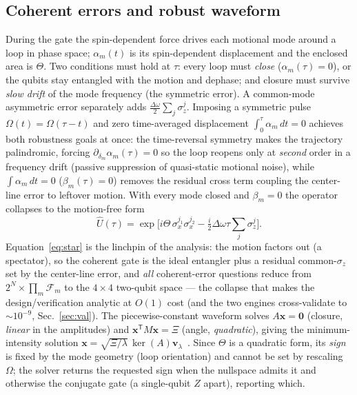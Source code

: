 \documentclass[aps,prapplied,twocolumn,superscriptaddress,floatfix,nofootinbib]{revtex4-2}
\begin{document}
\subsection{Coherent errors and robust waveform}
During the gate the spin-dependent force drives each motional mode around a loop in phase
space; $\alpha_m(t)$ is its spin-dependent displacement and the enclosed area is $\Theta$. Two
conditions must hold at $\tau$: every loop must \emph{close} ($\alpha_m(\tau)=0$), or the qubits
stay entangled with the motion and dephase; and closure must survive \emph{slow drift} of the
mode frequency (the symmetric error). A common-mode asymmetric error separately adds
$\tfrac{\Delta\omega}{2}\sum_j\sigma_z^j$. Imposing a symmetric pulse $\Omega(t)=\Omega(\tau-t)$
and zero time-averaged displacement $\int_0^\tau\alpha_m\,dt=0$ achieves both robustness goals
at once: the time-reversal symmetry makes the trajectory palindromic, forcing
$\partial_{\delta_m}\alpha_m(\tau)=0$ so the loop reopens only at \emph{second} order in a
frequency drift (passive suppression of quasi-static motional noise), while
$\int\alpha_m\,dt=0$ ($\beta_m(\tau)=0$) removes the residual cross term coupling the center-line
error to leftover motion. With every mode closed and $\beta_m=0$ the operator collapses to the
motion-free form
\begin{equation}
\hat U(\tau)=\exp\!\Big[i\Theta\,\sigma_x^{j_1}\sigma_x^{j_2}-\tfrac{i}{2}\Delta\omega\tau\!\sum_j\sigma_z^j\Big].
\label{eq:star}
\end{equation}
Equation~\eqref{eq:star} is the linchpin of the analysis: the motion factors out (a spectator),
so the coherent gate is the ideal entangler plus a residual common-$\sigma_z$ set by the
center-line error, and \emph{all} coherent-error questions reduce from
$2^N\!\times\!\prod_m\mathcal F_m$ to the $4\times4$ two-qubit space --- the collapse that makes
the design/verification analytic at $O(1)$ cost (and the two engines cross-validate to
$\sim\!10^{-9}$, Sec.~\ref{sec:val}). The piecewise-constant waveform solves $A\mathbf{x}=\mathbf 0$
(closure, \emph{linear} in the amplitudes) and $\mathbf{x}^{\mathsf T}M\mathbf{x}=\Xi$ (angle,
\emph{quadratic}), giving the minimum-intensity solution
$\mathbf{x}=\sqrt{\Xi/\lambda}\,\ker(A)\mathbf v_\lambda$~\cite{Zhang25,Leung18}. Since $\Theta$ is
a quadratic form, its \emph{sign} is fixed by the mode geometry (loop orientation) and cannot be
set by rescaling $\Omega$; the solver returns the requested sign when the nullspace admits it and
otherwise the conjugate gate (a single-qubit $Z$ apart), reporting which.
\end{document}
